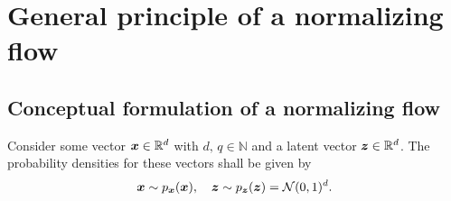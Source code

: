 \documentclass[a4paper,11pt]{report}
\begin{document}
\section{General principle of a normalizing flow}

\subsection{Conceptual formulation of a normalizing flow}
Consider some vector $\bm{x} \in \mathbb{R}^d$ with $d,\,q \in \mathbb{N}$ and a latent vector $\bm{z} \in \mathbb{R}^d$. The probability densities for these vectors shall be given by \begin{equation}
\bm{x} \sim p_{\bm{x}}(\bm{x}), \quad \bm{z}\sim p_{\bm{z}}(\bm{z}) = \mathcal{N}(0,1)^d.
\end{equation}
\end{document}
